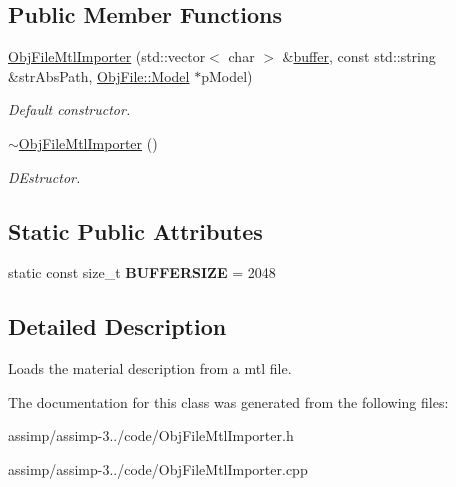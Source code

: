 \subsection*{Public Member Functions}
\begin{DoxyCompactItemize}
\item 
\hypertarget{class_assimp_1_1_obj_file_mtl_importer_a4c2889db015a6967f210e5e2e67859d8}{\hyperlink{class_assimp_1_1_obj_file_mtl_importer_a4c2889db015a6967f210e5e2e67859d8}{Obj\+File\+Mtl\+Importer} (std\+::vector$<$ char $>$ \&\hyperlink{structbuffer}{buffer}, const std\+::string \&str\+Abs\+Path, \hyperlink{struct_assimp_1_1_obj_file_1_1_model}{Obj\+File\+::\+Model} $\ast$p\+Model)}\label{class_assimp_1_1_obj_file_mtl_importer_a4c2889db015a6967f210e5e2e67859d8}

\begin{DoxyCompactList}\small\item\em Default constructor. \end{DoxyCompactList}\item 
\hypertarget{class_assimp_1_1_obj_file_mtl_importer_a7a774743e991ff54442b44cd51e4b639}{\hyperlink{class_assimp_1_1_obj_file_mtl_importer_a7a774743e991ff54442b44cd51e4b639}{$\sim$\+Obj\+File\+Mtl\+Importer} ()}\label{class_assimp_1_1_obj_file_mtl_importer_a7a774743e991ff54442b44cd51e4b639}

\begin{DoxyCompactList}\small\item\em D\+Estructor. \end{DoxyCompactList}\end{DoxyCompactItemize}
\subsection*{Static Public Attributes}
\begin{DoxyCompactItemize}
\item 
\hypertarget{class_assimp_1_1_obj_file_mtl_importer_a84a2c96d465a7871f9b7e0045608b064}{static const size\+\_\+t {\bfseries B\+U\+F\+F\+E\+R\+S\+I\+Z\+E} = 2048}\label{class_assimp_1_1_obj_file_mtl_importer_a84a2c96d465a7871f9b7e0045608b064}

\end{DoxyCompactItemize}


\subsection{Detailed Description}
Loads the material description from a mtl file. 

The documentation for this class was generated from the following files\+:\begin{DoxyCompactItemize}
\item 
assimp/assimp-\/3../code/Obj\+File\+Mtl\+Importer.\+h\item 
assimp/assimp-\/3../code/Obj\+File\+Mtl\+Importer.\+cpp\end{DoxyCompactItemize}
